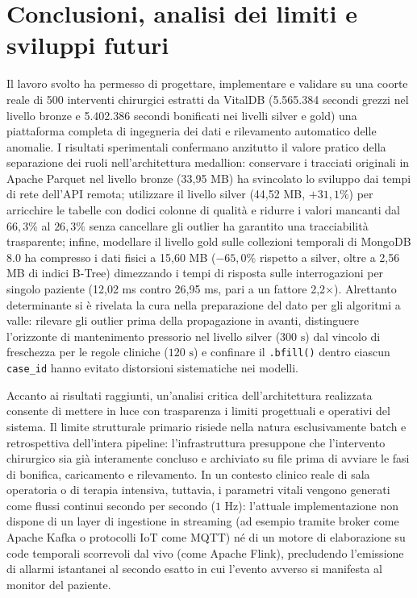 \section{Conclusioni, analisi dei limiti e sviluppi futuri}
Il lavoro svolto ha permesso di progettare, implementare e validare su una coorte reale di 500 interventi chirurgici estratti da VitalDB (5.565.384 secondi grezzi nel livello bronze e 5.402.386 secondi bonificati nei livelli silver e gold) una piattaforma completa di ingegneria dei dati e rilevamento automatico delle anomalie. I risultati sperimentali confermano anzitutto il valore pratico della separazione dei ruoli nell'architettura medallion: conservare i tracciati originali in Apache Parquet nel livello bronze (33,95 MB) ha svincolato lo sviluppo dai tempi di rete dell'API remota; utilizzare il livello silver (44,52 MB, $+31,1\%$) per arricchire le tabelle con dodici colonne di qualit\`a e ridurre i valori mancanti dal $66,3\%$ al $26,3\%$ senza cancellare gli outlier ha garantito una tracciabilit\`a trasparente; infine, modellare il livello gold sulle collezioni temporali di MongoDB 8.0 ha compresso i dati fisici a 15,60 MB ($-65,0\%$ rispetto a silver, oltre a 2,56 MB di indici B-Tree) dimezzando i tempi di risposta sulle interrogazioni per singolo paziente (12,02 ms contro 26,95 ms, pari a un fattore 2,2$\times$). Alrettanto determinante si \`e rivelata la cura nella preparazione del dato per gli algoritmi a valle: rilevare gli outlier prima della propagazione in avanti, distinguere l'orizzonte di mantenimento pressorio nel livello silver ($300\text{ s}$) dal vincolo di freschezza per le regole cliniche ($120\text{ s}$) e confinare il \texttt{.bfill()} dentro ciascun \texttt{case\_id} hanno evitato distorsioni sistematiche nei modelli.

Accanto ai risultati raggiunti, un'analisi critica dell'architettura realizzata consente di mettere in luce con trasparenza i limiti progettuali e operativi del sistema. Il limite strutturale primario risiede nella natura esclusivamente batch e retrospettiva dell'intera pipeline: l'infrastruttura presuppone che l'intervento chirurgico sia gi\`a interamente concluso e archiviato su file prima di avviare le fasi di bonifica, caricamento e rilevamento. In un contesto clinico reale di sala operatoria o di terapia intensiva, tuttavia, i parametri vitali vengono generati come flussi continui secondo per secondo ($1\text{ Hz}$): l'attuale implementazione non dispone di un layer di ingestione in streaming (ad esempio tramite broker come Apache Kafka o protocolli IoT come MQTT) n\'e di un motore di elaborazione su code temporali scorrevoli dal vivo (come Apache Flink), precludendo l'emissione di allarmi istantanei al secondo esatto in cui l'evento avverso si manifesta al monitor del paziente.

